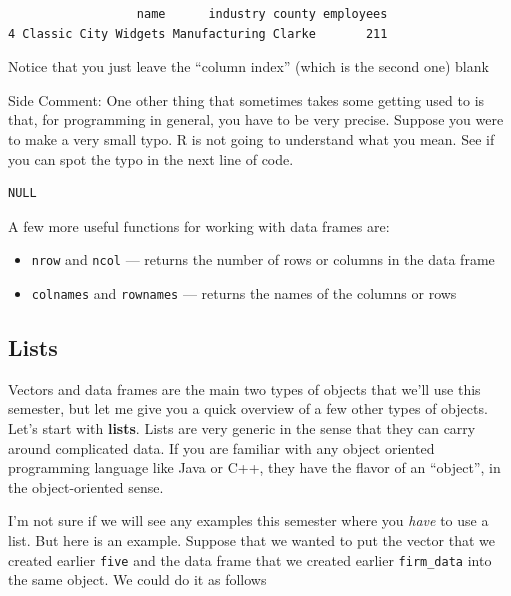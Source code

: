 \documentclass[
  letterpaper,
  DIV=11,
  numbers=noendperiod]{scrreprt}
\newenvironment{Shaded}{\begin{snugshade}}{\end{snugshade}}
\newcommand{\NormalTok}[1]{\textcolor[rgb]{0.00,0.23,0.31}{#1}}
\newcommand{\SpecialCharTok}[1]{\textcolor[rgb]{0.37,0.37,0.37}{#1}}
\begin{document}
\begin{verbatim}
                  name      industry county employees
4 Classic City Widgets Manufacturing Clarke       211
\end{verbatim}

Notice that you just leave the ``column index'' (which is the second
one) blank

{Side Comment:} One other thing that sometimes takes some getting used
to is that, for programming in general, you have to be very precise.
Suppose you were to make a very small typo. R is not going to understand
what you mean. See if you can spot the typo in the next line of code.

\begin{Shaded}
\end{Shaded}

\begin{verbatim}
NULL
\end{verbatim}

A few more useful functions for working with data frames are:

\begin{itemize}
\item
  \texttt{nrow} and \texttt{ncol} --- returns the number of rows or
  columns in the data frame
\item
  \texttt{colnames} and \texttt{rownames} --- returns the names of the
  columns or rows
\end{itemize}

\subsection{Lists}\label{lists}

Vectors and data frames are the main two types of objects that we'll use
this semester, but let me give you a quick overview of a few other types
of objects. Let's start with \textbf{lists}. Lists are very generic in
the sense that they can carry around complicated data. If you are
familiar with any object oriented programming language like Java or C++,
they have the flavor of an ``object'', in the object-oriented sense.

I'm not sure if we will see any examples this semester where you
\emph{have} to use a list. But here is an example. Suppose that we
wanted to put the vector that we created earlier \texttt{five} and the
data frame that we created earlier \texttt{firm\_data} into the same
object. We could do it as follows
\end{document}
